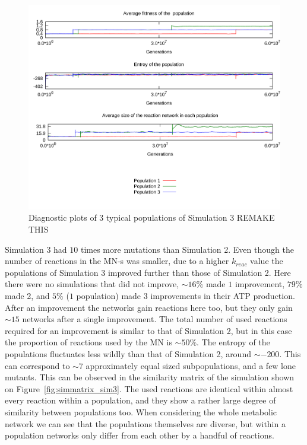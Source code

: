 \documentclass[a4paper,12pt]{article}
\begin{document}
\begin{figure}[htpb]
	\centering
	\includegraphics[width=0.8\linewidth]{simulation3.pdf}
	\caption{Diagnostic plots of 3 typical populations of Simulation 3 REMAKE THIS}
	\label{fig:simulation3}
\end{figure}

Simulation 3 had $10$ times more mutations than Simulation 2. Even though the number of reactions in the MN-s was smaller, due to a higher $k_{reac}$ value the populations of Simulation 3 improved further than those of Simulation 2. Here there were no simulations that did not improve, $\sim 16\%$ made $1$ improvement, $79\%$ made 2, and $5\%$ ($1$ population) made $3$ improvements in their ATP production. After an improvement the networks gain reactions here too, but they only gain $\sim 15$ networks after a single improvement. The total number of used reactions required for an improvement is similar to that of Simulation 2, but in this case the proportion of reactions used by the MN is $\sim 50\%$. The entropy of the populations fluctuates less wildly than that of Simulation 2, around $\sim -200$. This can correspond to $\sim 7$ approximately equal sized subpopulations, and a few lone mutants. This can be observed in the similarity matrix of the simulation shown on Figure~\ref{fig:simmatrix_sim3}. The used reactions are identical within almost every reaction within a population, and they show a rather large degree of similarity between populations too. When considering the whole metabolic network we can see that the populations themselves are diverse, but within a population networks only differ from each other by a handful of reactions. 
\end{document}
